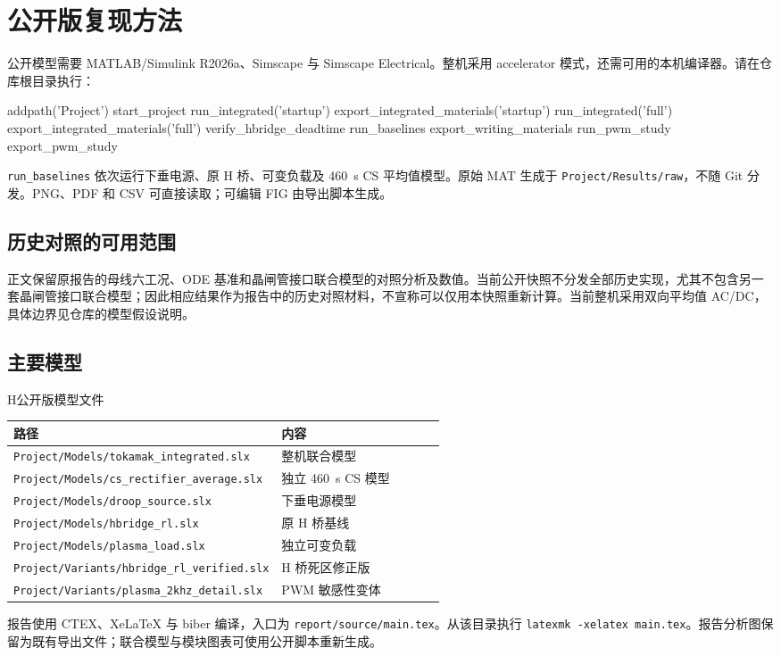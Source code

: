 \chapter{公开版复现方法}
\label{app:repro}
\sloppy
公开模型需要 MATLAB/Simulink R2026a、Simscape 与 Simscape Electrical。整机采用 accelerator 模式，还需可用的本机编译器。请在仓库根目录执行：
\begin{codeblock}[language=Matlab]
addpath('Project')
start_project
run_integrated('startup')
export_integrated_materials('startup')
run_integrated('full')
export_integrated_materials('full')
verify_hbridge_deadtime
run_baselines
export_writing_materials
run_pwm_study
export_pwm_study
\end{codeblock}
\texttt{run\_baselines} 依次运行下垂电源、原 H 桥、可变负载及 460~s CS 平均值模型。原始 MAT 生成于 \texttt{Project/Results/raw}，不随 Git 分发。PNG、PDF 和 CSV 可直接读取；可编辑 FIG 由导出脚本生成。
\section{历史对照的可用范围}
正文保留原报告的母线六工况、ODE 基准和晶闸管接口联合模型的对照分析及数值。当前公开快照不分发全部历史实现，尤其不包含另一套晶闸管接口联合模型；因此相应结果作为报告中的历史对照材料，不宣称可以仅用本快照重新计算。当前整机采用双向平均值 AC/DC，具体边界见仓库的模型假设说明。
\section{主要模型}
\begin{dtable}{H}{公开版模型文件}
\begin{tabularx}{\linewidth}{P{0.62\linewidth}L}
\toprule
\headrow 路径 & 内容 \\
\midrule
\texttt{Project/Models/tokamak\_integrated.slx} & 整机联合模型 \\
\texttt{Project/Models/cs\_rectifier\_average.slx} & 独立 460~s CS 模型 \\
\texttt{Project/Models/droop\_source.slx} & 下垂电源模型 \\
\texttt{Project/Models/hbridge\_rl.slx} & 原 H 桥基线 \\
\texttt{Project/Models/plasma\_load.slx} & 独立可变负载 \\
\texttt{Project/Variants/hbridge\_rl\_verified.slx} & H 桥死区修正版 \\
\texttt{Project/Variants/plasma\_2khz\_detail.slx} & PWM 敏感性变体 \\
\bottomrule
\end{tabularx}
\end{dtable}
报告使用 CTEX、XeLaTeX 与 biber 编译，入口为 \texttt{report/source/main.tex}。从该目录执行 \texttt{latexmk -xelatex main.tex}。报告分析图保留为既有导出文件；联合模型与模块图表可使用公开脚本重新生成。
